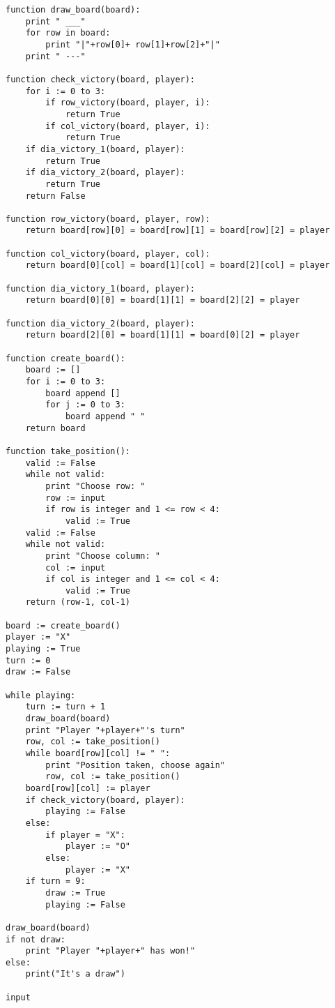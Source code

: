 \documentclass[11pt, a4paper]{article} %
\begin{document}
\begin{lstlisting}
function draw_board(board):
    print " ___"
    for row in board:
        print "|"+row[0]+ row[1]+row[2]+"|"
    print " ---"

function check_victory(board, player):
    for i := 0 to 3:
        if row_victory(board, player, i):
            return True
        if col_victory(board, player, i):
            return True
    if dia_victory_1(board, player):
        return True
    if dia_victory_2(board, player):
        return True
    return False
    
function row_victory(board, player, row):
    return board[row][0] = board[row][1] = board[row][2] = player
    
function col_victory(board, player, col):
    return board[0][col] = board[1][col] = board[2][col] = player
    
function dia_victory_1(board, player):
    return board[0][0] = board[1][1] = board[2][2] = player

function dia_victory_2(board, player):
    return board[2][0] = board[1][1] = board[0][2] = player

function create_board():
	board := []
	for i := 0 to 3:
	    board append []
	    for j := 0 to 3:
	        board append " "
    return board
    
function take_position():
    valid := False
    while not valid:
        print "Choose row: "
        row := input
        if row is integer and 1 <= row < 4:
            valid := True
    valid := False
    while not valid:
        print "Choose column: "
        col := input
        if col is integer and 1 <= col < 4:
            valid := True
    return (row-1, col-1)
    
board := create_board()
player := "X"
playing := True
turn := 0
draw := False

while playing:
    turn := turn + 1
    draw_board(board)
    print "Player "+player+"'s turn"
    row, col := take_position()
    while board[row][col] != " ":
        print "Position taken, choose again"
        row, col := take_position()
    board[row][col] := player
    if check_victory(board, player):
        playing := False
    else:
        if player = "X":
            player := "O"
        else:
            player := "X"
    if turn = 9:
        draw := True
        playing := False

draw_board(board)
if not draw:
    print "Player "+player+" has won!"
else:
    print("It's a draw")

input 
\end{lstlisting}
\end{document}
